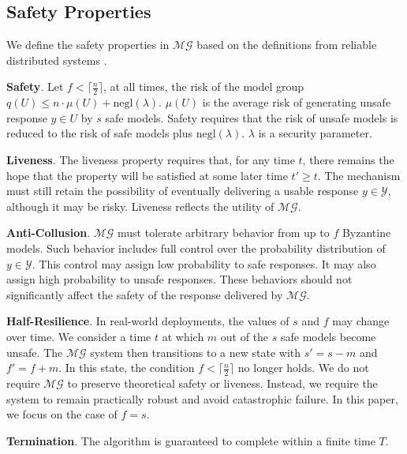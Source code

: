 \documentclass[11pt]{article}
\begin{document}
\subsection{Safety Properties}


We define the safety properties in $\mathcal{MG}$ based on the definitions from reliable distributed systems \citep{cachin2011introduction}.

\noindent
\textbf{Safety}. Let $f < \lceil \frac{n}{2} \rceil$, at all times, the risk of the model group $q(U) \leq n \cdot \mu(U) + \mathrm{negl}(\lambda)$. $\mu(U)$ is the average risk of generating unsafe response $y \in U$ by $s$ safe models. Safety requires that the risk of unsafe models is reduced to the risk of safe models plus $\mathrm{negl}(\lambda)$. $\lambda$ is a security parameter.

\noindent
\textbf{Liveness}. The liveness property requires that, for any time $t$, there remains the hope that the property will be satisfied at some later time $t' \ge t$. The mechanism must still retain the possibility of eventually delivering a usable response $y \in \mathcal{Y}$, although it may be risky. Liveness reflects the utility of $\mathcal{MG}$.



\noindent
\textbf{Anti-Collusion}.
$\mathcal{MG}$ must tolerate arbitrary behavior from up to $f$ Byzantine models. Such behavior includes full control over the probability distribution of $y \in \mathcal{Y}$. This control may assign low probability to safe responses. It may also assign high probability to unsafe responses. These behaviors should not significantly affect the safety of the response delivered by $\mathcal{MG}$.


\noindent
\textbf{Half-Resilience}. In real-world deployments, the values of $s$ and $f$ may change over time. We consider a time $t$ at which $m$ out of the $s$ safe models become unsafe. The $\mathcal{MG}$ system then transitions to a new state with $s' = s - m$ and $f' = f + m$. In this state, the condition $f < \lceil \frac{n}{2} \rceil$ no longer holds. We do not require $\mathcal{MG}$ to preserve theoretical safety or liveness. Instead, we require the system to remain practically robust and avoid catastrophic failure. In this paper, we focus on the case of $f=s$.


\noindent
\textbf{Termination}. 
The algorithm is guaranteed to complete within a finite time $T$.
\end{document}
